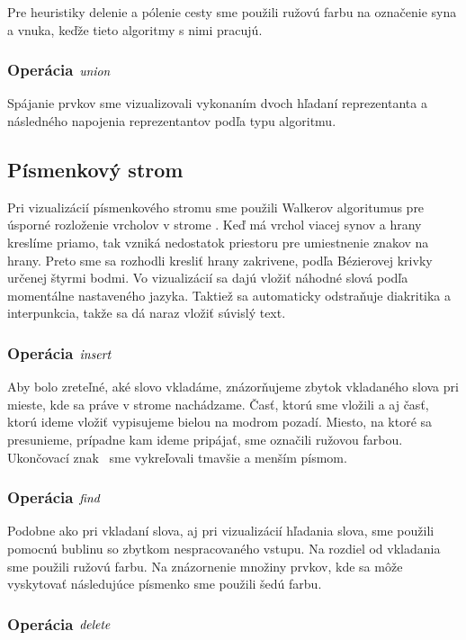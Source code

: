 Pre heuristiky delenie a pólenie cesty sme použili ružovú farbu na označenie 
syna a vnuka, keďže tieto algoritmy s nimi pracujú.

\subsubsection{Operácia $\mathop{\mathit{union}}$}

Spájanie prvkov sme vizualizovali vykonaním dvoch hľadaní reprezentanta a 
následného napojenia reprezentantov podľa typu algoritmu.

\subsection{Písmenkový strom}

Pri vizualizácií písmenkového stromu sme použili 
Walkerov algoritumus pre úsporné rozloženie vrcholov v strome
\citep{walker}. Keď má vrchol viacej synov a hrany kreslíme priamo, tak vzniká 
nedostatok priestoru pre umiestnenie znakov na hrany. Preto sme sa rozhodli 
kresliť hrany zakrivene, podľa Bézierovej krivky určenej štyrmi bodmi. 
Vo vizualizácií sa dajú vložiť náhodné slová podľa momentálne nastaveného 
jazyka. Taktiež sa automaticky odstraňuje diakritika a interpunkcia, takže 
sa dá naraz vložiť súvislý text.

\subsubsection{Operácia $\mathop{\mathit{insert}}$}

Aby bolo zreteľné, aké slovo vkladáme, znázorňujeme zbytok vkladaného slova 
pri mieste, kde sa práve v strome nachádzame. Časť, ktorú sme vložili a aj 
časť, ktorú ideme vložiť vypisujeme bielou na modrom pozadí. Miesto, na ktoré 
sa presunieme, prípadne kam ideme pripájať, sme označili ružovou farbou. 
Ukončovací znak \uz\ sme vykreľovali tmavšie a menším písmom.

\subsubsection{Operácia $\mathop{\mathit{find}}$}

Podobne ako pri vkladaní slova, aj pri vizualizácií hľadania slova, sme 
použili pomocnú bublinu so zbytkom nespracovaného vstupu. Na rozdiel od 
vkladania sme použili ružovú farbu. Na znázornenie množiny prvkov, kde sa môže 
vyskytovať následujúce písmenko sme použili šedú farbu.

\subsubsection{Operácia $\mathop{\mathit{delete}}$}

